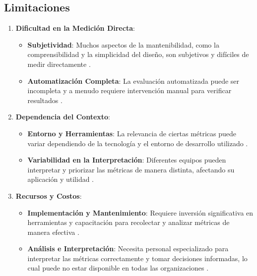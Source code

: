 \documentclass{article}
\begin{document}
\subsection{Limitaciones}
\begin{enumerate}
    \item \textbf{Dificultad en la Medición Directa}:
    \begin{itemize}
        \item \textbf{Subjetividad}: Muchos aspectos de la mantenibilidad, como la comprensibilidad y la simplicidad del diseño, son subjetivos y difíciles de medir directamente \cite{QuandaryPeak}.
        \item \textbf{Automatización Completa}: La evaluación automatizada puede ser incompleta y a menudo requiere intervención manual para verificar resultados .
    \end{itemize}
    \item \textbf{Dependencia del Contexto}:
    \begin{itemize}
        \item \textbf{Entorno y Herramientas}: La relevancia de ciertas métricas puede variar dependiendo de la tecnología y el entorno de desarrollo utilizado .
        \item \textbf{Variabilidad en la Interpretación}: Diferentes equipos pueden interpretar y priorizar las métricas de manera distinta, afectando su aplicación y utilidad .
    \end{itemize}
    \item \textbf{Recursos y Costos}:
    \begin{itemize}
        \item \textbf{Implementación y Mantenimiento}: Requiere inversión significativa en herramientas y capacitación para recolectar y analizar métricas de manera efectiva .
        \item \textbf{Análisis e Interpretación}: Necesita personal especializado para interpretar las métricas correctamente y tomar decisiones informadas, lo cual puede no estar disponible en todas las organizaciones \cite{QuandaryPeak}.
    \end{itemize}
\end{enumerate}
\end{document}
